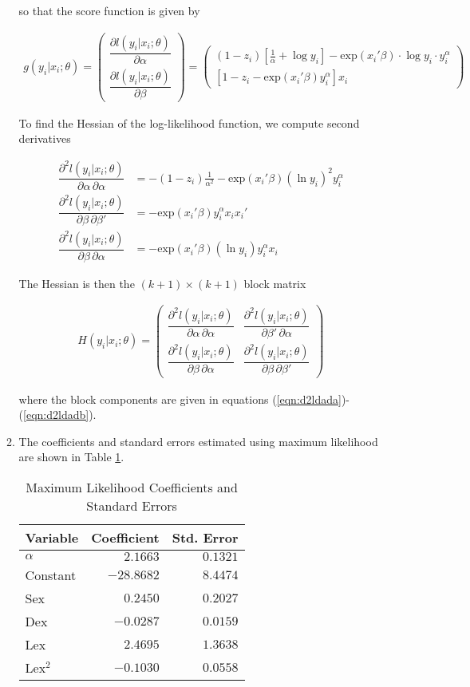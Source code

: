\documentclass[]{report}
\newcommand{\0}{\bv{0}}
\newcommand{\1}{\bv{1}}
\newcommand{\twovec}[2]{\parens{\begin{array}{c} #1 \\ #2 \end{array}}}
\newcommand{\twobytwomat}[4]{\parens{\begin{array}{cc} #1 & #2 \\ #3 & #4 \end{array}}}
\newcommand{\parens}[1]{\left(#1\right)}
\renewcommand{\exp}[1]{\mathrm{exp}\parens{#1}}
\newcommand{\oneover}[1]{\frac{1}{#1}}
\newcommand{\partialdtwo}[3]{ \dfrac{\partial^2 #1}{\partial #2 \, \partial #3}}
\begin{document}
\begin{enumerate}[1.]
\begin{enumerate}
so that the score function is given by

\begin{align}
	g(y_i | x_i ; \theta) = \twovec{\dfrac{\partial l(y_i | x_i ; \theta)}{\partial \alpha}}{\dfrac{\partial l(y_i | x_i ; \theta)}{\partial \beta}} = \twovec{(1 - z_i) \left[ \oneover{\alpha} + \log y_i \right] - \exp{x_i' \beta} \cdot \log{y_i} \cdot y_i^\alpha}{\left[ 1 - z_i - \exp{x_i' \beta} y_i^\alpha \right] x_i}
\end{align}

To find the Hessian of the log-likelihood function, we compute second derivatives


\begin{align}
  \partialdtwo{ l(y_i | x_i ; \theta)}{\alpha}{\alpha} &= - (1-z_i) \oneover{\alpha^2} - \exp{x_i' \beta} (\ln y_i)^2 y_i^\alpha \label{eqn:d2ldada}\\
 \partialdtwo{ l(y_i | x_i ; \theta)}{\beta}{\beta'} &= -\exp{x_i' \beta} y_i^\alpha x_i x_i'\\
  \partialdtwo{ l(y_i | x_i ; \theta)}{\beta}{\alpha} &= - \exp{x_i' \beta} (\ln y_i) y_i^\alpha x_i \label{eqn:d2ldadb}
\end{align}

The Hessian is then the $(k+1) \times (k+1)$ block matrix 

\begin{align}
	H(y_i|x_i; \theta) = \twobytwomat{\partialdtwo{ l(y_i | x_i ; \theta)}{\alpha}{\alpha}}{\partialdtwo{ l(y_i | x_i ; \theta)}{\beta'}{\alpha}}{\partialdtwo{ l(y_i | x_i ; \theta)}{\beta}{\alpha}}{\partialdtwo{ l(y_i | x_i ; \theta)}{\beta}{\beta'}}
\end{align}

where the block components are given in equations (\ref{eqn:d2ldada})-(\ref{eqn:d2ldadb}).

\item
The coefficients and standard errors estimated using maximum likelihood are shown in Table \ref{tbl:MLE_estimates}.


\begin{table}[htbp]
	\caption{Maximum Likelihood Coefficients and Standard Errors}
	\label{tbl:MLE_estimates}
	\begin{center}
		\begin{tabular}{lrr}
			Variable&Coefficient&Std. Error\\
			\hline
			$\alpha$&$2.1663$&$0.1321$\\
			Constant&$-28.8682$&$8.4474$\\
			Sex&$0.2450$&$0.2027$\\
			Dex&$-0.0287$&$0.0159$\\
			Lex&$2.4695$&$1.3638$\\
			Lex$^2$&$-0.1030$&$0.0558$\\
		\end{tabular}
	\end{center}
\end{table}



\end{enumerate}
\end{enumerate}
\end{document}
